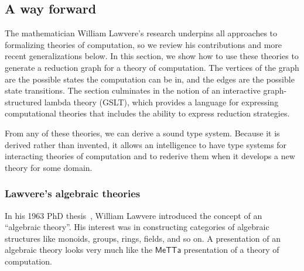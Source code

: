 \documentclass{article}
\begin{document}
\subsection{A way forward}
\label{A way forward}

The mathematician William Lawvere's research underpins all approaches
to formalizing theories of computation, so we review his contributions
and more recent generalizations below.  In this section, we show how
to use these theories to generate a reduction graph for a theory of
computation.  The vertices of the graph are the possible states the
computation can be in, and the edges are the possible state
transitions.  The section culminates in the notion of an interactive
graph-structured lambda theory (GSLT), which provides a language for
expressing computational theories that includes the ability to express
reduction strategies.

From any of these theories, we can derive a sound type system.
Because it is derived rather than invented, it allows an intelligence
to have type systems for interacting theories of computation and to
rederive them when it develops a new theory for some domain.

\subsubsection{Lawvere's algebraic theories}

In his 1963 PhD thesis~\cite{Lawvere1963}, William Lawvere introduced
the concept of an ``algebraic theory''.  His interest was in
constructing categories of algebraic structures like monoids, groups,
rings, fields, and so on.  A presentation of an algebraic theory looks
very much like the $\mathsf{MeTTa}$ presentation of a theory of
computation.
\end{document}

